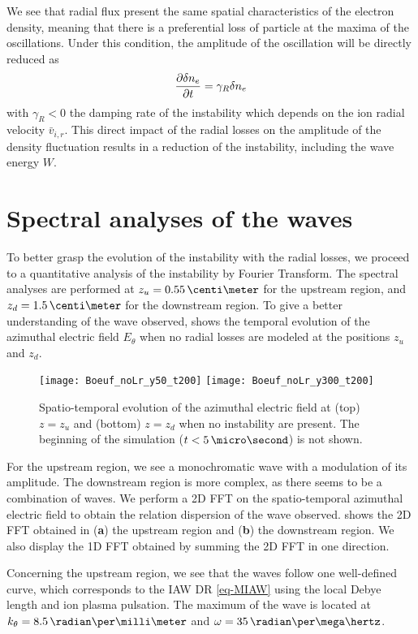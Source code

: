 We see that radial flux present the same spatial characteristics of the electron density, meaning that there is a preferential loss of particle at the maxima of the oscillations.
Under this condition, the amplitude of the oscillation will be directly reduced as
\[ \frac{\partial \delta n_e}{\partial t} =  \gamma_R \delta n_e \]
with $\gamma_R < 0$ the damping rate of the instability which depends on the ion radial velocity $ \bar{v}_{i, r}$.
This direct impact of the radial losses on the amplitude of the density fluctuation results in a reduction of the instability, including the wave energy $W$.

\FloatBarrier

\section{Spectral analyses of the waves} \label{subsec-fft}

To better grasp the evolution of the instability with the radial losses, we proceed to a quantitative analysis of the instability by Fourier Transform.
The spectral analyses are performed at $z_u=0.55\,\centi\meter$ for the upstream region, and $z_d=1.5\,\centi\meter$ for the downstream region.
To give a better understanding of the wave observed,  shows the temporal evolution of the azimuthal electric field $E_{\theta}$ when no radial losses are modeled at the positions $z_u$ and $z_d$.

\begin{figure}[!hbt]
  \centering
  \texttt{[image: Boeuf\_noLr\_y50\_t200]}
  \texttt{[image: Boeuf\_noLr\_y300\_t200]}
  \caption{Spatio-temporal evolution of the azimuthal electric field at (top) $z=z_u$ and (bottom) $z=z_d$ when no instability are present. The beginning of the simulation ($t<5\,\micro\second$) is not shown. }
  \label{fig-cut2D}
\end{figure}


For the upstream region, we see a monochromatic wave with a modulation of its amplitude.
The downstream region is more complex, as there seems to be a combination of waves.
We perform a \ac{2D} \ac{FFT} on the spatio-temporal azimuthal electric field to obtain the relation dispersion of the wave observed.
 shows the \ac{2D} \ac{FFT} obtained in ({\bf a}) the upstream region and ({\bf b}) the downstream region.
We also display the \ac{1D} \ac{FFT} obtained by summing the \ac{2D} \ac{FFT} in one direction.

Concerning the upstream region, we see that the waves follow one well-defined curve, which corresponds to the \ac{IAW} \ac{DR} \cref{eq-MIAW} using the local Debye length and ion plasma pulsation.
The maximum of the wave is located at $k_{\theta} = 8.5\,\radian\per\milli\meter$ and $\omega = 35\, \radian\per\mega\hertz$.

